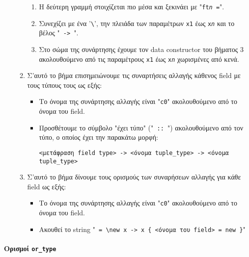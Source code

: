 \documentclass[diploma]{softlab-thesis}
\begin{document}
\begin{itemize}
\begin{enumerate}
\begin{enumerate}
\item
Η δεύτερη γραμμή στοιχίζεται πιο μέσα και ξεκινάει με "\texttt{ft\textit{n}
=}".

\item
Συνεχίζει με ένα '\verb|\|', την πλειάδα των παραμέτρων \texttt{x1} έως
\texttt{x\textit{n}} και το βέλος "\texttt{ -> }".

\item
Στο σώμα της συνάρτησης έχουμε τον data constructor του βήματος 3 ακολουθούμενο
από τις παραμέτρους \texttt{x1} έως \texttt{x\textit{n}} χωρισμένες από κενά.

\end{enumerate}

\item
Σ'αυτό το βήμα επισημειώνουμε τις συναρτήσεις αλλαγής κάθενος field με τους
τύπους τους ως εξής:

\begin{itemize}
\item
Το όνομα της συνάρτησης αλλαγής είναι "\texttt{c0}" ακολουθούμενο από το όνομα
του field.

\item
Προσθέτουμε το σύμβολο "έχει τύπο" ("\verb| :: |") ακολουθούμενο από τον τύπο,
ο οποίος έχει την παρακάτω μορφή:
\begin{verbatim}
<μετάφραση field type> -> <όνομα tuple_type> -> <όνομα tuple_type>
\end{verbatim}


\end{itemize}

\item
Σ'αυτό το βήμα δίνουμε τους ορισμούς των συναρήσεων αλλαγής για κάθε field
ως εξής:

\begin{itemize}
\item
Το όνομα της συνάρτησης αλλαγής είναι "\texttt{c0}" ακολουθούμενο από το όνομα
του field.

\item
Ακουθεί το string "\verb| = \new x -> x { <όνομα του field> = new }|"

\end{itemize}

\end{enumerate}

\end{itemize}

\paragraph{Ορισμοί \texttt{or_type}}
\end{document}
